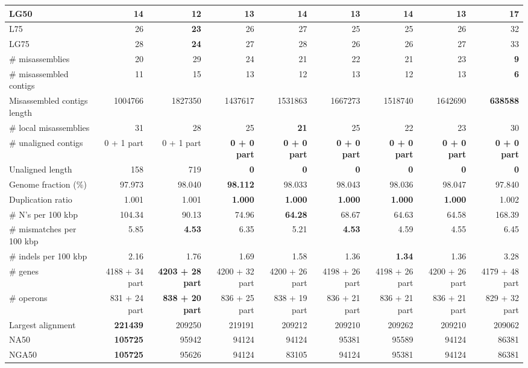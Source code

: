 \documentclass[12pt,a4paper]{article}
\begin{document}
\begin{table}[ht]
\begin{center}
\begin{tabular}{|l*{8}{|r}|}
LG50 & 14 & {\bf 12} & 13 & 14 & 13 & 14 & 13 & 17 \\ \hline
L75 & 26 & {\bf 23} & 26 & 27 & 25 & 25 & 26 & 32 \\ \hline
LG75 & 28 & {\bf 24} & 27 & 28 & 26 & 26 & 27 & 33 \\ \hline
\# misassemblies & 20 & 29 & 24 & 21 & 22 & 21 & 23 & {\bf 9} \\ \hline
\# misassembled contigs & 11 & 15 & 13 & 12 & 13 & 12 & 13 & {\bf 6} \\ \hline
Misassembled contigs length & 1004766 & 1827350 & 1437617 & 1531863 & 1667273 & 1518740 & 1642690 & {\bf 638588} \\ \hline
\# local misassemblies & 31 & 28 & 25 & {\bf 21} & 25 & 22 & 23 & 30 \\ \hline
\# unaligned contigs & 0 + 1 part & 0 + 1 part & {\bf 0 + 0 part} & {\bf 0 + 0 part} & {\bf 0 + 0 part} & {\bf 0 + 0 part} & {\bf 0 + 0 part} & {\bf 0 + 0 part} \\ \hline
Unaligned length & 158 & 719 & {\bf 0} & {\bf 0} & {\bf 0} & {\bf 0} & {\bf 0} & {\bf 0} \\ \hline
Genome fraction (\%) & 97.973 & 98.040 & {\bf 98.112} & 98.033 & 98.043 & 98.036 & 98.047 & 97.840 \\ \hline
Duplication ratio & 1.001 & 1.001 & {\bf 1.000} & {\bf 1.000} & {\bf 1.000} & {\bf 1.000} & {\bf 1.000} & 1.002 \\ \hline
\# N's per 100 kbp & 104.34 & 90.13 & 74.96 & {\bf 64.28} & 68.67 & 64.63 & 64.58 & 168.39 \\ \hline
\# mismatches per 100 kbp & 5.85 & {\bf 4.53} & 6.35 & 5.21 & {\bf 4.53} & 4.59 & 4.55 & 6.45 \\ \hline
\# indels per 100 kbp & 2.16 & 1.76 & 1.69 & 1.58 & 1.36 & {\bf 1.34} & 1.36 & 3.28 \\ \hline
\# genes & 4188 + 34 part & {\bf 4203 + 28 part} & 4200 + 32 part & 4200 + 26 part & 4198 + 26 part & 4198 + 26 part & 4200 + 26 part & 4179 + 48 part \\ \hline
\# operons & 831 + 24 part & {\bf 838 + 20 part} & 836 + 25 part & 838 + 19 part & 836 + 21 part & 836 + 21 part & 836 + 21 part & 829 + 32 part \\ \hline
Largest alignment & {\bf 221439} & 209250 & 219191 & 209212 & 209210 & 209262 & 209210 & 209062 \\ \hline
NA50 & {\bf 105725} & 95942 & 94124 & 94124 & 95381 & 95589 & 94124 & 86381 \\ \hline
NGA50 & {\bf 105725} & 95626 & 94124 & 83105 & 94124 & 95381 & 94124 & 86381 \\ \hline

\end{tabular}
\end{center}
\end{table}
\end{document}
